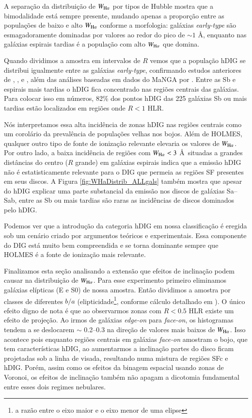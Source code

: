 A separação da distribuição de $W_{\Ha}$ por tipos de Hubble mostra que a bimodalidade está sempre presente, mudando apenas a proporção entre as populações de baixo e alto $W_{\Ha}$ conforme a morfologia: galáxias {\em early-type} são esmagadoramente dominadas por valores ao redor do pico de $\sim 1$ \AA, enquanto nas galáxias espirais tardias é a população com alto $W_{\Ha}$ que domina.

Quando dividimos a amostra em intervalos de $R$ vemos que a população hDIG se distribui igualmente entre as galáxias {\em early-type}, confirmando estudos anteriores de \citet{Kehrig.etal.2012}, \citet{Singh.etal.2013}, e \citet{Gomes.etal.2016b}, além das análises baseadas em dados do MaNGA por \citet{Belfiore.etal.2016, Belfiore.etal.2017}. Entre as Sb e espirais mais tardias o hDIG fica concentrado nas regiões centrais das galáxias. Para colocar isso em números, 82\% dos pontos hDIG das 225 galáxias Sb ou mais tardias estão localizados em regiões onde $R < 1$ HLR.

Nós interpretamos essa alta incidência de zonas hDIG nas regiões centrais como um corolário da prevalência de populações velhas nos bojos. Além de HOLMES, qualquer outro tipo de fonte de ionização relevante elevaria os valores de $W_{\Ha}$. Por outro lado, a baixa incidência de regiões com $W_{\Ha} < 3$ \AA\ situadas a grandes distâncias do centro ($R$ grande) em galáxias espirais indica que a emissão hDIG não é estatisticamente relevante para o DIG que permeia as regiões SF presentes em seus discos. A Figura \ref{fig:WHaDistrib_ALLgals} também mostra que apesar do hDIG explicar uma parte substancial da emissão nos discos de galáxias Sa--Sab, entre as Sb ou mais tardias são raras as incidências de discos dominados pelo hDIG.

Podemos ver que a introdução da categoria hDIG em nossa classificação é eregida sob um cenário criado por argumentos teóricos e experimentais. Essa componente do DIG está muito bem compreendida e se torna dominante sempre que HOLMES é a fonte de ionização mais relevante.

Finalizamos esta seção analisando a extensão que efeitos de inclinação podem causar na distribuição de $W_{\Ha}$. Para esse experimento primeiro eliminamos galáxias elípticas (E e S0) de nossa amostra. Então dividimos a amostra por classes de diferentes $b/a$ (elipticidade\footnote{a razão entre o eixo maior e o eixo menor de uma elipse}, conforme cálculo detalhado em \citealt{deAmorim.etal.2017}). O único efeito digno de nota é que ao observarmos zonas com $R < 0.5$ HLR existe um efeito de projeção. Ao irmos de galáxias {\em edge-on} para {\em face-on}, os histogramas tendem a se deslocarem $\sim$ 0.2--0.3 na direção de valores mais baixos de $W_{\Ha}$. Isso acontece pois enquanto regiões centrais em galáxias {\em face-on} amostram o bojo, que tem características hDIG, ao aumentarmos a inclinação partes do disco ficam projetadas sob a linha de visada, resultando numa mistura de regiões SFc e hDIG. Porém, assim como os efeitos da binagem espacial usando zonas de Voronoi, os efeitos de inclinação também não apagam a dicotomia fundamental entre esses dois regimes nebulares.

